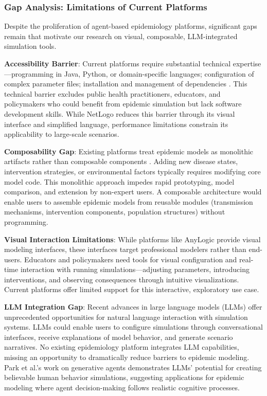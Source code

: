 \subsubsection{Gap Analysis: Limitations of Current Platforms}

Despite the proliferation of agent-based epidemiology platforms, significant gaps remain that motivate our research on visual, composable, LLM-integrated simulation tools.

\textbf{Accessibility Barrier}: Current platforms require substantial technical expertise---programming in Java, Python, or domain-specific languages; configuration of complex parameter files; installation and management of dependencies \cite{kravari2015survey}. This technical barrier excludes public health practitioners, educators, and policymakers who could benefit from epidemic simulation but lack software development skills. While NetLogo reduces this barrier through its visual interface and simplified language, performance limitations constrain its applicability to large-scale scenarios.

\textbf{Composability Gap}: Existing platforms treat epidemic models as monolithic artifacts rather than composable components \cite{north2010introducing}. Adding new disease states, intervention strategies, or environmental factors typically requires modifying core model code. This monolithic approach impedes rapid prototyping, model comparison, and extension by non-expert users. A composable architecture would enable users to assemble epidemic models from reusable modules (transmission mechanisms, intervention components, population structures) without programming.

\textbf{Visual Interaction Limitations}: While platforms like AnyLogic provide visual modeling interfaces, these interfaces target professional modelers rather than end-users. Educators and policymakers need tools for visual configuration and real-time interaction with running simulations---adjusting parameters, introducing interventions, and observing consequences through intuitive visualizations. Current platforms offer limited support for this interactive, exploratory use case.

\textbf{LLM Integration Gap}: Recent advances in large language models (LLMs) offer unprecedented opportunities for natural language interaction with simulation systems. LLMs could enable users to configure simulations through conversational interfaces, receive explanations of model behavior, and generate scenario narratives. No existing epidemiology platform integrates LLM capabilities, missing an opportunity to dramatically reduce barriers to epidemic modeling. Park et al.'s work on generative agents \cite{park2023generative} demonstrates LLMs' potential for creating believable human behavior simulations, suggesting applications for epidemic modeling where agent decision-making follows realistic cognitive processes.


